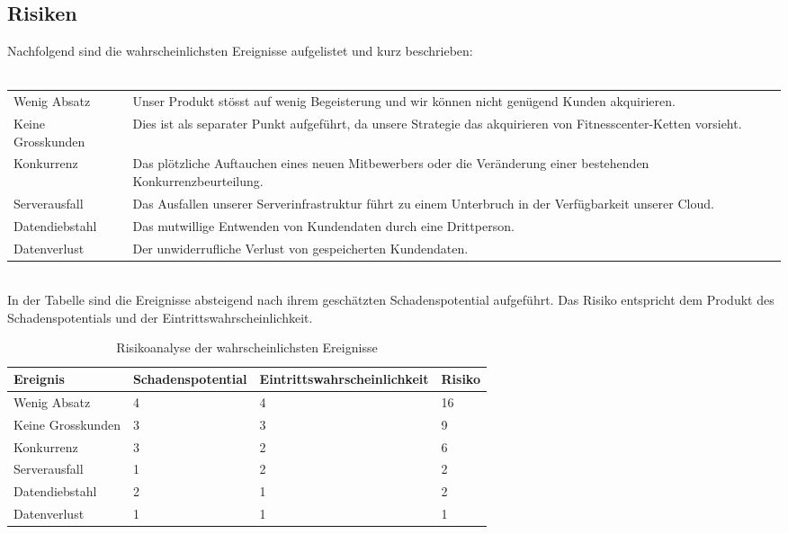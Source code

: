 \subsection{Risiken}
Nachfolgend sind die wahrscheinlichsten Ereignisse aufgelistet und kurz beschrieben:
\\ \\
\begin{tabu} to \linewidth {l X}
	Wenig Absatz & Unser Produkt stösst auf wenig Begeisterung und wir können nicht genügend Kunden akquirieren. \newline \\
	Keine Grosskunden & Dies ist als separater Punkt aufgeführt, da unsere Strategie das akquirieren von Fitnesscenter-Ketten vorsieht. \newline \\
	Konkurrenz & Das plötzliche Auftauchen eines neuen Mitbewerbers oder die Veränderung einer bestehenden Konkurrenzbeurteilung. \newline \\
	Serverausfall & Das Ausfallen unserer Serverinfrastruktur führt zu einem Unterbruch in der Verfügbarkeit unserer Cloud. \newline \\
	Datendiebstahl & Das mutwillige Entwenden von Kundendaten durch eine Drittperson. \newline \\
	Datenverlust & Der unwiderrufliche Verlust von gespeicherten Kundendaten. \newline \\
\end{tabu}

\hfill \\
In der Tabelle sind die Ereignisse absteigend nach ihrem geschätzten Schadenspotential aufgeführt. Das Risiko entspricht dem Produkt des Schadenspotentials und der Eintrittswahrscheinlichkeit.
\begin{table}[h]
	\centering
	\begin{tabu} to \linewidth {l l l l}
		\toprule
		Ereignis & Schadenspotential & Eintrittswahrscheinlichkeit & Risiko \\
		\midrule
		Wenig Absatz & 4 & 4 & 16 \\
		Keine Grosskunden & 3 & 3 & 9 \\
		Konkurrenz & 3 & 2 & 6 \\
		Serverausfall & 1 & 2 & 2 \\
		Datendiebstahl & 2 & 1 & 2 \\
		Datenverlust & 1 & 1 & 1 \\
		\bottomrule
	\end{tabu}
	\label{tbl:risikoanalyse}
	\caption{Risikoanalyse der wahrscheinlichsten Ereignisse}
\end{table}

